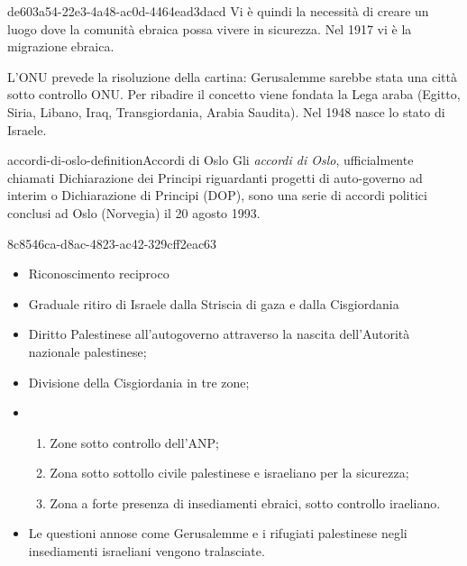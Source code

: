 \documentclass[preview]{standalone}
\begin{document}
\begin{snippet}{de603a54-22e3-4a48-ac0d-4464ead3dacd}
    Vi è quindi la necessità di creare un luogo dove la comunità ebraica possa vivere in sicurezza.
    Nel 1917 vi è la migrazione ebraica.
    
    L'ONU prevede la risoluzione della cartina:
    Gerusalemme sarebbe stata una città sotto controllo ONU.
    Per ribadire il concetto viene fondata la Lega araba
    (Egitto, Siria, Libano, Iraq, Transgiordania, Arabia Saudita).
    Nel 1948 nasce lo stato di Israele. 
    
\end{snippet}

\begin{snippetdefinition}{accordi-di-oslo-definition}{Accordi di Oslo}
    Gli \textit{accordi di Oslo}, ufficialmente chiamati Dichiarazione dei
    Principi riguardanti progetti di auto-governo ad interim o
    Dichiarazione di Principi (DOP), sono una serie di accordi
    politici conclusi ad Oslo (Norvegia) il 20 agosto 1993.
\end{snippetdefinition}

\begin{snippet}{8c8546ca-d8ac-4823-ac42-329cff2eac63}
    \begin{itemize}
        \item Riconoscimento reciproco
        \item Graduale ritiro di Israele dalla Striscia di gaza e dalla Cisgiordania
        \item Diritto Palestinese all'autogoverno attraverso la nascita dell'Autorità nazionale palestinese;
        \item Divisione della Cisgiordania in tre zone;
        \item \begin{enumerate}
            \item Zone sotto controllo dell'ANP;
            \item Zona sotto sottollo civile palestinese e israeliano per la sicurezza;
            \item Zona a forte presenza di insediamenti ebraici, sotto controllo iraeliano.
        \end{enumerate}
        \item Le questioni annose come Gerusalemme e i rifugiati palestinese negli insediamenti israeliani vengono tralasciate.
    \end{itemize}
\end{snippet}
\end{document}
